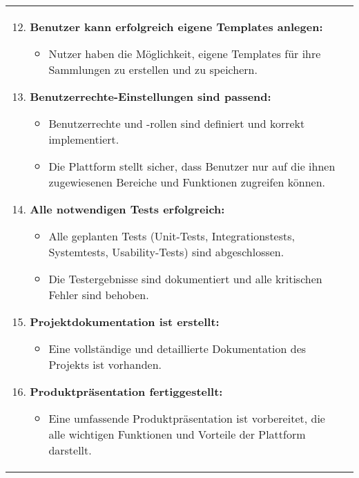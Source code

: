 \newpage

\begin{tabularx}{\textwidth}{L R}
    \begin{enumerate}[left=0pt,label=\arabic*.]
        \setcounter{enumi}{11}
        \small %
        \item \textbf{Benutzer kann erfolgreich eigene Templates anlegen:}
        \begin{itemize}[label=--]
            \item Nutzer haben die Möglichkeit, eigene Templates für ihre Sammlungen zu erstellen und zu speichern.
        \end{itemize}

        \item \textbf{Benutzerrechte-Einstellungen sind passend:}
        \begin{itemize}[label=--]
            \item Benutzerrechte und -rollen sind definiert und korrekt implementiert.
            \item Die Plattform stellt sicher, dass Benutzer nur auf die ihnen zugewiesenen Bereiche und Funktionen zugreifen können.
        \end{itemize}

        \item \textbf{Alle notwendigen Tests erfolgreich:}
        \begin{itemize}[label=--]
            \item Alle geplanten Tests (Unit-Tests, Integrationstests, Systemtests, Usability-Tests) sind abgeschlossen.
            \item Die Testergebnisse sind dokumentiert und alle kritischen Fehler sind behoben.
        \end{itemize}

        \item \textbf{Projektdokumentation ist erstellt:}
        \begin{itemize}[label=--]
            \item Eine vollständige und detaillierte Dokumentation des Projekts ist vorhanden.
        \end{itemize}

        \item \textbf{Produktpräsentation fertiggestellt:}
        \begin{itemize}[label=--]
            \item Eine umfassende Produktpräsentation ist vorbereitet, die alle wichtigen Funktionen und Vorteile der Plattform darstellt.
        \end{itemize}


\end{enumerate}
\end{tabularx}
